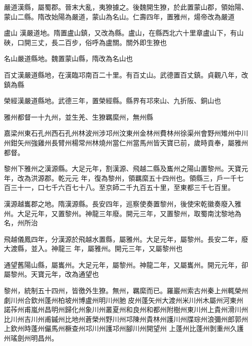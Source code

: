 \begin{pinyinscope}
 嚴道漢縣，屬蜀郡。晉末大亂，夷獠據之。後魏開生獠，於此置蒙山郡，領始陽、蒙山二縣。隋改始陽為嚴道，蒙山為名山。仁壽四年，置雅州，煬帝改為嚴道



 盧山
 漢嚴道地。隋置盧山鎮，又改為縣。盧山，在縣西北六十里章盧山下，有山硤，口開三丈，長二百步，俗呼為盧關。關外即生獠也



 名山嚴道縣地。魏置蒙山縣，隋改為名山也



 百丈漢嚴道縣地，在漢臨邛南百二十里。有百丈山。武德置百丈鎮。貞觀八年，改鎮為縣



 榮經漢嚴道縣地。武德三年，置榮經縣。縣界有邛來山、九折阪、銅山也



 雅州都督一十九州，並生羌、生獠羈縻州，無州縣



 嘉梁州東石孔州西石孔州林波州涉邛州汶東州金林州費林州徐渠州會野州雉州中川州鉗矢州強雞州長臂州楊常州林燒州當仁州當馬州皆天寶已前，歲時貢奉，屬雅州都督。



 黎州下雅州之漢源縣。大足元年，割漢源、飛越二縣及巂州之陽山置黎州。天寶元年，改為洪源郡。乾元元
 年，復為黎州，領羈縻五十四州也。領縣三，戶一千七百三十一，口七千六百七十八。至京師二千九百五十里，至東都三千七百里。



 漢源越巂郡之地。隋漢源縣。長安四年，巡察使奏置黎州，後使宋乾徽奏廢入雅州。大足元年，又置黎州。神龍三年廢。開元三年，又置黎州，取蜀南沈黎地為名，州所治



 飛越儀鳳四年，分漢源於飛越水置縣，屬雅州。大足元年，屬黎州。長安二年，廢大渡縣，並入。神龍三
 年，屬雅州。開元三年，又屬黎州也



 通望舊陽山縣，屬巂州。大足元年，屬黎州。神龍二年，又屬巂州。開元元年，卻屬黎州。天寶元年，改為通望也



 黎州，統制五十四州，皆徼外生獠。無州，羈縻而已。羅巖州索古州秦上州輒榮州劇川州合欽州蓬州柏坡州博盧州明川州肔皮州蓬矢州大渡州米川州木屬州河東州
 諾莋州甫嵐州昌明州歸化州象川州叢夏州和良州和都州附樹州東川州上貴州滑川州比川州吉川州甫鏚州比地州蒼榮州野川州邛陳州貴林州護川州牒琮州浪彌州郎郭州上欽州時蓬州儼馬州橛查州邛川州護邛州腳川州開望州
 上蓬州比蓬州剝重州久護州瑤劍州明昌州。




\end{pinyinscope}
